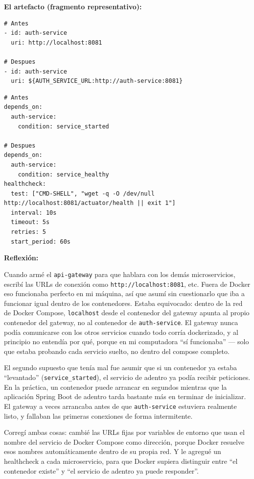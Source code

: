 \documentclass[10pt,journal,a4paper]{IEEEtran}
\begin{document}
\textbf{El artefacto (fragmento representativo):}

\begin{lstlisting}[caption={Cambio en las rutas del API Gateway (commit \texttt{4f95c43}).}]
# Antes
- id: auth-service
  uri: http://localhost:8081

# Despues
- id: auth-service
  uri: ${AUTH_SERVICE_URL:http://auth-service:8081}
\end{lstlisting}

\begin{lstlisting}[caption={Condicion de dependencia y healthcheck agregado.}]
# Antes
depends_on:
  auth-service:
    condition: service_started

# Despues
depends_on:
  auth-service:
    condition: service_healthy
healthcheck:
  test: ["CMD-SHELL", "wget -q -O /dev/null http://localhost:8081/actuator/health || exit 1"]
  interval: 10s
  timeout: 5s
  retries: 5
  start_period: 60s
\end{lstlisting}

\textbf{Reflexión:}

Cuando armé el \texttt{api-gateway} para que hablara con los demás
microservicios, escribí las URLs de conexión como
\texttt{http://localhost:8081}, etc. Fuera de Docker eso funcionaba perfecto
en mi máquina, así que asumí sin cuestionarlo que iba a funcionar igual dentro
de los contenedores. Estaba equivocado: dentro de la red de Docker Compose,
\texttt{localhost} desde el contenedor del gateway apunta al propio
contenedor del gateway, no al contenedor de \texttt{auth-service}. El gateway
nunca podía comunicarse con los otros servicios cuando todo corría
dockerizado, y al principio no entendía por qué, porque en mi computadora
``sí funcionaba'' --- solo que estaba probando cada servicio suelto, no dentro
del compose completo.

El segundo supuesto que tenía mal fue asumir que si un contenedor ya estaba
``levantado'' (\texttt{service\_started}), el servicio de adentro ya podía
recibir peticiones. En la práctica, un contenedor puede arrancar en segundos
mientras que la aplicación Spring Boot de adentro tarda bastante más en
terminar de inicializar. El gateway a veces arrancaba antes de que
\texttt{auth-service} estuviera realmente listo, y fallaban las primeras
conexiones de forma intermitente.

Corregí ambas cosas: cambié las URLs fijas por variables de entorno que usan
el nombre del servicio de Docker Compose como dirección, porque Docker
resuelve esos nombres automáticamente dentro de su propia red. Y le agregué
un healthcheck a cada microservicio, para que Docker supiera distinguir entre
``el contenedor existe'' y ``el servicio de adentro ya puede responder''.
\end{document}
